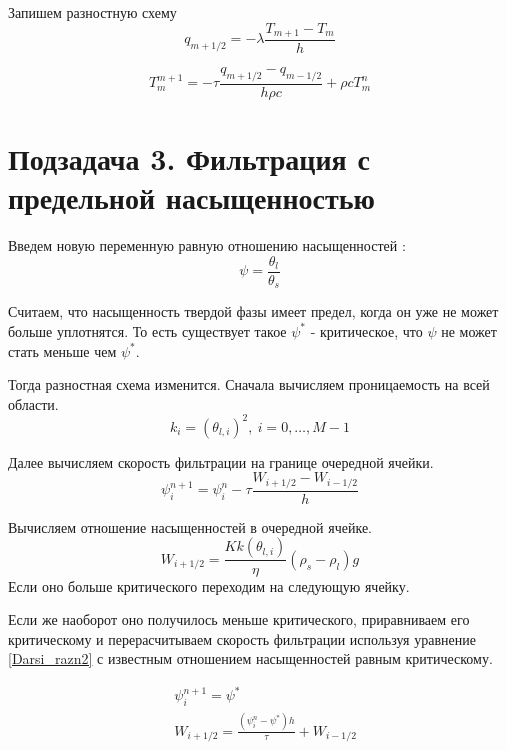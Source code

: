 \documentclass[12pt]{article}
\begin{document}
Запишем разностную схему
\begin{equation}
q_{m+1/2} = - \lambda\frac{T_{m+1} - T_m}{h}
\label{termal_razn_1}
\end{equation}

\begin{equation}
T_m^{m+1} = - \tau\frac{q_{m+1/2} - q_{m-1/2}}{h\rho c} + \rho c T_m^n
\label{termal_razn_2}
\end{equation}

\newpage
\section*{Подзадача 3. Фильтрация с предельной насыщенностью}
Введем новую переменную равную отношению насыщенностей : 
$$
\psi = \frac{\theta_l}{\theta_s} 
$$

Считаем, что насыщенность твердой фазы имеет предел, когда он уже не может больше уплотнятся. То есть существует такое $ \psi^* $ - критическое, что $\psi $ не может стать меньше чем $\psi^*$. 

Тогда разностная схема изменится. 
Сначала вычисляем проницаемость на всей области.
\begin{equation}
k_i = (\theta_{l,i})^2 , \ i = 0,  \dots ,M-1
\label{perm_razn2}
\end{equation}

Далее вычисляем скорость фильтрации на границе очередной ячейки.
\begin{equation}
\psi_i^{n+1} = \psi_i^n - \tau\frac{W_{i+1/2} - W_{i-1/2}}{h}
\label{filtr_razn2}
\end{equation}

Вычисляем отношение насыщенностей в очередной ячейке. 
\begin{equation}
W_{i+1/2} = \frac{K k(\theta_{l,i})}{\eta}(\rho_s-\rho_l)g
\label{Darsi_razn2}
\end{equation}
Если оно больше критического переходим на следующую ячейку.

Если же наоборот оно получилось меньше критического, приравниваем его критическому и перерасчитываем скорость фильтрации используя уравнение \eqref{Darsi_razn2} с известным отношением насыщенностей равным критическому.

\begin{equation}
\begin{aligned}
&\psi_{i}^{n+1} = \psi^* \\
&W_{i+1/2} = \frac{(\psi_i^n - \psi^*)h}{\tau} + W_{i-1/2} \\
\end{aligned}
\label{corr_razn}
\end{equation}
\end{document}
